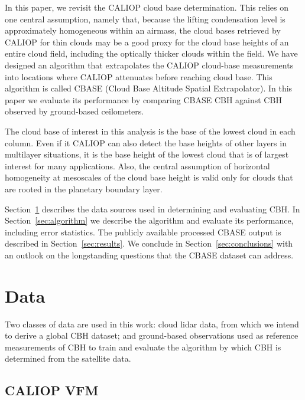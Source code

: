 \documentclass[essd,manuscript]{copernicus}\usepackage[]{graphicx}\usepackage[]{color}
\begin{document}
In this paper, we revisit the CALIOP cloud base determination.  This relies on
one central assumption, namely that, because the
lifting condensation level is approximately homogeneous within an airmass, the
cloud bases retrieved by CALIOP for thin clouds may be a good proxy for the cloud
base heights of an entire cloud field, including the optically thicker clouds
within the field.  
We have designed an algorithm that extrapolates the CALIOP
cloud-base measurements into locations where CALIOP attenuates before reaching
cloud base.  This algorithm is called CBASE (Cloud Base Altitude Spatial
Extrapolator).  In this paper we evaluate its performance by comparing CBASE
CBH against CBH observed by ground-based
ceilometers.

The cloud base of interest in this analysis is the base of the lowest cloud in
each column. Even if it CALIOP can also detect the base heights of other layers
in multilayer situations, it is the base height of the lowest cloud that is of
largest interest for many applications. Also, the central assumption of
horizontal homogeneity at mesoscales of the cloud base height is valid only for
clouds that are rooted in the planetary boundary layer.

Section~\ref{sec:data} describes the data sources used in determining and
evaluating CBH.  In Section~\ref{sec:algorithm} we describe
the algorithm and evaluate its performance, including error statistics.  The
publicly available processed CBASE output is described in
Section~\ref{sec:results}.  We conclude in Section~\ref{sec:conclusions} with an
outlook on the longstanding questions that the CBASE dataset can address.

\section{Data}
\label{sec:data}

Two classes of data are used in this work: cloud lidar data, from which we
intend to derive a global CBH dataset; and ground-based observations used as
reference measurements of CBH to train and evaluate the algorithm by which
CBH is determined from the satellite data.

\subsection{CALIOP VFM}
\end{document}

